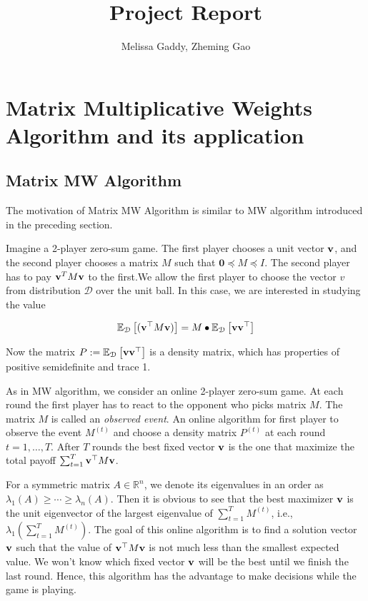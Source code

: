 \documentclass[12pt]{article}
\def\bf{\textbf}
\begin{document}
 
 
\title{Project Report}
\author{Melissa Gaddy, Zheming Gao}
\maketitle

\section{Matrix Multiplicative Weights Algorithm and its application}



\subsection{Matrix MW Algorithm}

The motivation of Matrix MW Algorithm is similar to MW algorithm introduced in the preceding section.

Imagine a 2-player zero-sum game. The first player chooses a unit vector $\bf v$, and the second player chooses a matrix $M$ such that $\textbf{0} \preceq M \preceq I$. The second player has to pay $\bf v^TM\bf v$ to the first.We allow the first player to choose the vector $v$ from distribution $\mathcal D$ over the unit ball. In this case, we are interested in studying the value

$$
\mathbb E_{\mathcal D} \left[(\bf v^\top M\bf v)\right] = M \bullet \mathbb E_{\mathcal D} \left[\bf v\bf v^\top\right]
$$

Now the matrix $P:= \mathbb E_{\mathcal D} \left[\bf v\bf v^\top\right]$ is a density matrix, which has properties of positive semidefinite and trace 1.

As in MW algorithm, we consider an online 2-player zero-sum game. At each round the first player has to react to the opponent who picks matrix $M$. The matrix $M$ is called an \textit{observed event}. An online algorithm for first player to observe the event $M^{(t)}$ and choose a density matrix $P^{(t)}$ at each round $t = 1, \dots, T$. After $T$ rounds the best fixed vector $\bf v$ is the one that maximize the total payoff $\sum_{t = 1}^T \bf v^\top M \bf v$. 

For a symmetric matrix $A\in \mathbb R^n$, we denote its eigenvalues in an order as $\lambda_1(A) \geqslant \cdots \geqslant \lambda_n(A)$. Then it is obvious to see that the best maximizer $\bf v$ is the unit eigenvector of the largest eigenvalue of $\sum_{t = 1}^T M^{(t)}$, i.e., $\lambda_1(\sum_{t = 1}^T M^{(t)})$. The goal of this online algorithm is to find a solution vector $\bf v$ such that the value of $\bf v^\top M \bf v$ is not much less than the smallest expected value. We won't know which fixed vector $\bf v$ will be the best until we finish the last round. Hence, this algorithm has the advantage to make decisions while the game is playing.
\end{document}
